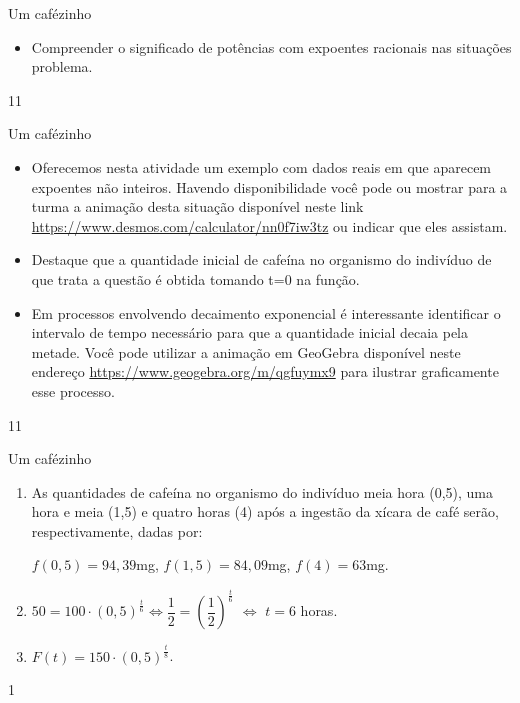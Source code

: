 \cleardoublepage
\def\currentcolor{session1}
\begin{objectives}{Um cafézinho}
{
\begin{itemize}
\item Compreender o significado de potências com expoentes racionais nas situações problema.

\end{itemize}
}{1}{1}
\end{objectives}
\begin{sugestions}{Um cafézinho}
{
\begin{itemize}
\item Oferecemos nesta atividade um exemplo com dados reais em que aparecem expoentes não inteiros. Havendo disponibilidade você pode ou mostrar para a turma a animação desta situação disponível neste link \url{https://www.desmos.com/calculator/nn0f7iw3tz} ou indicar que eles assistam.

\item Destaque que a quantidade inicial de cafeína no organismo do indivíduo de que trata a questão é obtida tomando t=0 na função.

\item Em processos envolvendo decaimento exponencial é interessante identificar o intervalo de tempo necessário para que a quantidade inicial decaia pela metade. Você pode utilizar a animação em GeoGebra disponível neste endereço \url{https://www.geogebra.org/m/qgfuymx9} para ilustrar graficamente esse processo.

\end{itemize}
}{1}{1}
\end{sugestions}
\begin{answer}{Um cafézinho}
{
\begin{enumerate}
\item
As quantidades de cafeína no organismo do indivíduo meia hora (0,5), uma hora e meia (1,5) e quatro horas (4) após a ingestão da xícara de café serão, respectivamente, dadas por:

$f(0,5)=94{,}39$mg, \quad $f(1,5)=84{,}09$mg, \quad $f(4)=63$mg.

\item $50=100\cdot(0,5)^{\frac{t}{6}}\iff\dfrac{1}{2}=\left( \dfrac{1}{2} \right)^{\frac{t}{6}}$ $\iff$ $t=6$ horas.

\item $F(t)=150\cdot(0{,}5)^{\frac{t}{8}}$.

\end{enumerate}
}{1}
\end{answer}
